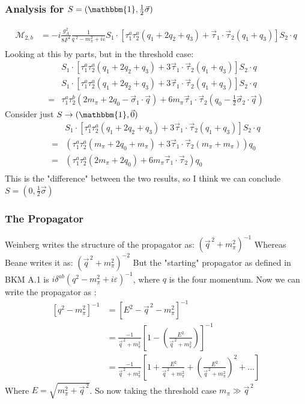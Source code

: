 \documentclass[11pt]{article}
\newcommand\ddfrac[2]{\frac{\displaystyle #1}{\displaystyle #2}}
\newcommand\mm{\mathcal{M}}
\newcommand{\sq}{^{\,2}}
\begin{document}
\subsubsection{Analysis for $S=(\mathbbm{1},\frac{1}{2} \vec{\sigma}) $}
\begin{align}
    \mm_{2,b}&=-i\frac{g_A^2}{8F^4}\frac{1}{q^{\;2}- m_\pi^2 + i \varepsilon} S_1 \cdot \left[ \tau_1^a\tau_2^a (q_1+2q_2+q_3) + \vec{\tau}_1 \cdot \vec{\tau}_2 (q_1+q_3)\right] S_2 \cdot q\\
\end{align}
Looking at this by parts, but in the threshold case:
\begin{align}
     &S_1 \cdot \left[ \tau_1^a\tau_2^a (q_1+2q_2+q_3) +3\vec{\tau}_1 \cdot \vec{\tau}_2 (q_1+q_3)\right] S_2 \cdot q\\
     &S_1 \cdot \left[ \tau_1^a\tau_2^a (q_1+2q_2+q_3) +3\vec{\tau}_1 \cdot \vec{\tau}_2 (q_1+q_3)\right] S_2 \cdot q\\
    =& \tau_1^a \tau_2^b \left(2 m_\pi +2 q_0 - \vec{\sigma}_1 \cdot \vec{q}\right)+6m_\pi\vec{\tau}_1 \cdot \vec{\tau}_2\left( q_0 - \frac{1}{2} \vec{\sigma}_2 \cdot \vec{q}\right)
\end{align}
Consider just $S \to (\mathbbm{1}, \vec{0})$
\begin{align}
     &S_1 \cdot \left[ \tau_1^a\tau_2^a (q_1+2q_2+q_3) +3\vec{\tau}_1 \cdot \vec{\tau}_2 (q_1+q_3)\right] S_2 \cdot q\\
     =& \left( \tau_1^a\tau_2^a (m_\pi+2 q_0 +m_\pi) +3\vec{\tau}_1 \cdot \vec{\tau}_2 (m_\pi+m_\pi)\right) q_0\\
     =& \left( \tau_1^a\tau_2^a (2 m_\pi+2 q_0) +6 m_\pi\vec{\tau}_1 \cdot \vec{\tau}_2 \right) q_0\\
\end{align}
This is the "difference" between the two results, so I think we can conclude $S= \left( 0, \frac{1}{2} \vec{\sigma}  \right) $


\subsubsection{The Propagator}
Weinberg writes the structure of the propagator as:
$(\vec{q}\sq +m_\pi^2)^{-1} $
Whereas Beane writes it as:
$(\vec{q}\sq +m_\pi^2)^{-2}$
But the "starting" propagator as defined in BKM A.1 is 
$i \delta^{ab} \left( q^2 -m_\pi^2 + i \varepsilon \right)^{-1}$, where $q$ is the four momentum.
Now we can write the propagator as :
\begin{align}
    \left[ q^2-m_\pi^2 \right]^{-1}&= \left[ E^2 -\vec{q}\sq -m_\pi^2 \right]^{-1}\\
                                   &= \frac{-1}{\vec{q}\sq +m_\pi^2} \left[ 1- \left( \ddfrac{E^2}{\vec{q}\sq +
                                   m_\pi^2}  \right) \right]^{-1}\\
                                   &= \frac{-1}{\vec{q}\sq +m_\pi^2} \left[ 1 + \frac{E^2}{\vec{q}\sq +m_\pi^2}+
                                   \left(\frac{E^2}{\vec{q}\sq +m_\pi^2}\right)^2 +... \right]
\end{align}
Where $E=\sqrt{m_\pi^2 + \vec{q}\sq}$. So now taking the threshold case $m_\pi\gg\vec{q}\sq$
\end{document}
